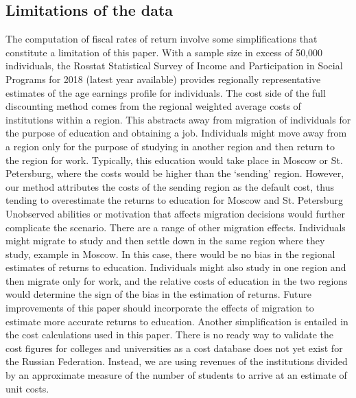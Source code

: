 \documentclass[alpha-refs]{wiley-article-05g}
\begin{document}
\subsection{Limitations of the data} 

The computation of fiscal rates of return involve some simplifications that 
constitute a limitation of this paper. With a sample size in excess of 
50,000 individuals, the Rosstat Statistical Survey of Income and 
Participation in Social Programs for 2018 (latest year available) provides 
regionally representative estimates of the age earnings profile for 
individuals. The cost side of the full discounting method comes from the 
regional weighted average costs of institutions within a region. This 
abstracts away from migration of individuals for the purpose of education 
and obtaining a job. Individuals might move away from a region only for the 
purpose of studying in another region and then return to the region for 
work. Typically, this education would take place in Moscow or St. 
Petersburg, where the costs would be higher than the `sending' region. 
However, our method attributes the costs of the sending region as the 
default cost, thus tending to overestimate the returns to education for 
Moscow and St. Petersburg Unobserved abilities or motivation that affects 
migration decisions would further complicate the scenario. There are a 
range of other migration effects. Individuals might migrate to study and 
then settle down in the same region where they study, example in Moscow. In 
this case, there would be no bias in the regional estimates of returns to 
education. Individuals might also study in one region and then migrate only 
for work, and the relative costs of education in the two regions would 
determine the sign of the bias in the estimation of returns.  Future 
improvements of this paper should incorporate the effects of migration to 
estimate more accurate returns to education. 
Another simplification is entailed in the cost calculations used in this paper. There is no ready way to validate the cost figures for colleges and universities as a cost database does not yet exist for the Russian Federation. Instead, we are using revenues of the institutions divided by an approximate measure of the number of students to arrive at an estimate of unit costs. 

\vspace{-0.5em}
\end{document}
